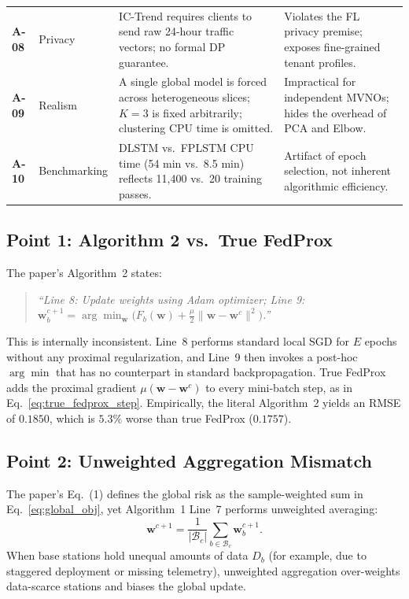 \documentclass[11pt,a4paper]{article}
\begin{document}
{\begin{longtable}{@{}p{0.95cm}p{1.9cm}p{6.0cm}p{5.2cm}@{}}
\textbf{A-08} & Privacy & IC-Trend requires clients to send raw 24-hour traffic vectors; no formal DP guarantee. & Violates the FL privacy premise; exposes fine-grained tenant profiles. \\[3pt]
\textbf{A-09} & Realism & A single global model is forced across heterogeneous slices; $K=3$ is fixed arbitrarily; clustering CPU time is omitted. & Impractical for independent MVNOs; hides the overhead of PCA and Elbow. \\[3pt]
\textbf{A-10} & Benchmarking & DLSTM vs.\ FPLSTM CPU time (54 min vs.\ 8.5 min) reflects 11,400 vs.\ 20 training passes. & Artifact of epoch selection, not inherent algorithmic efficiency. \\
\end{longtable}
}

\subsection{Point 1: Algorithm 2 vs.\ True FedProx}
The paper's Algorithm~2 states:
\begin{quote}
\textit{``Line 8: Update weights using Adam optimizer; Line 9: $\mathbf{w}_b^{c+1} = \arg\min_{\mathbf{w}} \big(F_b(\mathbf{w}) + \tfrac{\mu}{2}\|\mathbf{w} - \mathbf{w}^c\|^2\big)$.''}
\end{quote}
This is internally inconsistent. Line~8 performs standard local SGD for $E$ epochs without any proximal regularization, and Line~9 then invokes a post-hoc $\arg\min$ that has no counterpart in standard backpropagation. True FedProx adds the proximal gradient $\mu(\mathbf{w} - \mathbf{w}^c)$ to every mini-batch step, as in Eq.~\eqref{eq:true_fedprox_step}. Empirically, the literal Algorithm~2 yields an RMSE of $0.1850$, which is $5.3\%$ worse than true FedProx ($0.1757$).

\subsection{Point 2: Unweighted Aggregation Mismatch}
The paper's Eq.~(1) defines the global risk as the sample-weighted sum in Eq.~\eqref{eq:global_obj}, yet Algorithm~1 Line~7 performs unweighted averaging:
\begin{equation}
    \mathbf{w}^{c+1} = \frac{1}{|\mathcal{B}_c|} \sum_{b \in \mathcal{B}_c} \mathbf{w}_b^{c+1}.
\end{equation}
When base stations hold unequal amounts of data $D_b$ (for example, due to staggered deployment or missing telemetry), unweighted aggregation over-weights data-scarce stations and biases the global update.
\end{document}
